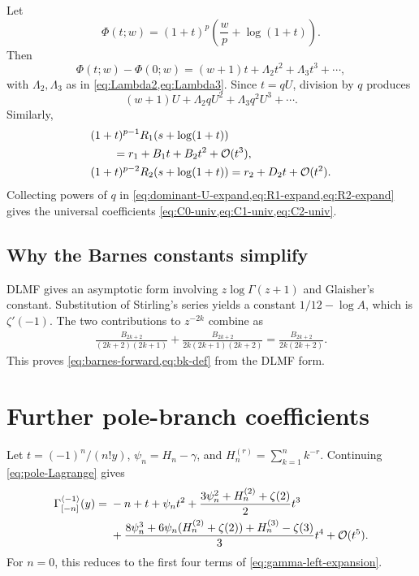 \documentclass[11pt,a4paper]{article}
\numberwithin{equation}{section}
\theoremstyle{definition}
\theoremstyle{remark}
\newcommand{\Ord}{\mathcal O}
\newcommand{\cinv}{\langle-1\rangle}
\begin{document}
Let
\begin{equation}
 \Phi(t;w)=(1+t)^p\left(\frac wp+\log(1+t)\right).
 \label{eq:Phi-dominant}
\end{equation}
Then
\begin{equation}
 \Phi(t;w)-\Phi(0;w)
 =(w+1)t+\Lambda_2t^2+\Lambda_3t^3+\cdots,
 \label{eq:Phi-expand}
\end{equation}
with \(\Lambda_2,\Lambda_3\) as in
\cref{eq:Lambda2,eq:Lambda3}.  Since \(t=qU\), division by \(q\) produces
\begin{equation}
 (w+1)U+\Lambda_2qU^2+\Lambda_3q^2U^3+\cdots.
 \label{eq:dominant-U-expand}
\end{equation}
Similarly,
\begin{align}
 &(1+t)^{p-1}R_1(s+\log(1+t))
 \notag\\
 &\qquad=r_1+B_1t+B_2t^2+\Ord(t^3),
 \label{eq:R1-expand}\\
 &(1+t)^{p-2}R_2(s+\log(1+t))
 =r_2+D_2t+\Ord(t^2).
 \label{eq:R2-expand}
\end{align}
Collecting powers of \(q\) in
\cref{eq:dominant-U-expand,eq:R1-expand,eq:R2-expand} gives the universal
coefficients \cref{eq:C0-univ,eq:C1-univ,eq:C2-univ}.

\subsection{Why the Barnes constants simplify}

DLMF gives an asymptotic form involving \(z\log\Gamma(z+1)\) and
Glaisher's constant.  Substitution of Stirling's series yields a constant
\(1/12-\log A\), which is \(\zeta'(-1)\).  The two contributions to
\(z^{-2k}\) combine as
\begin{align}
 \frac{B_{2k+2}}{(2k+2)(2k+1)}
 +\frac{B_{2k+2}}{2k(2k+1)(2k+2)}
 =\frac{B_{2k+2}}{2k(2k+2)}.
 \label{eq:barnes-coeff-combine}
\end{align}
This proves \cref{eq:barnes-forward,eq:bk-def} from the DLMF form.

\section{Further pole-branch coefficients}

Let \(t=(-1)^n/(n!y)\), \(\psi_n=H_n-\gamma\), and
\(H_n^{(r)}=\sum_{k=1}^nk^{-r}\).  Continuing
\cref{eq:pole-Lagrange} gives
\begin{align}
 \Gamma_{[-n]}^{\cinv}(y)={}&-n+t+\psi_nt^2
 +\frac{3\psi_n^2+H_n^{(2)}+\zeta(2)}2t^3
 \notag\\
 &+\frac{8\psi_n^3+6\psi_n(H_n^{(2)}+\zeta(2))
 +H_n^{(3)}-\zeta(3)}3t^4
 +\Ord(t^5).
 \label{eq:pole-four-terms}
\end{align}
For \(n=0\), this reduces to the first four terms of
\cref{eq:gamma-left-expansion}.
\end{document}
